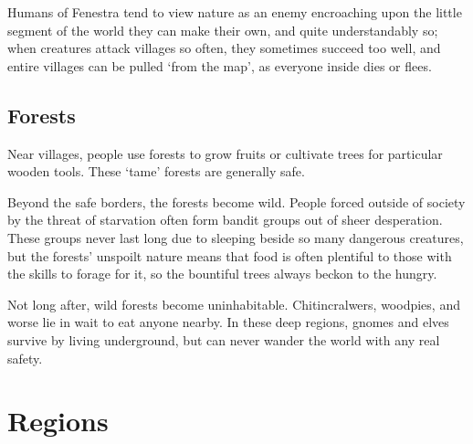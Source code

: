 \begin{multicols}{2}
Humans of Fenestra tend to view nature as an enemy encroaching upon the little segment of the world they can make their own, and quite understandably so; when creatures attack villages so often, they sometimes succeed too well, and entire villages can be pulled `from the map', as everyone inside dies or flees.

\subsection{Forests}

Near villages, people use forests to grow fruits or cultivate trees for particular wooden tools.  These `tame' forests are generally safe.

Beyond the safe borders, the forests become wild.  People forced outside of society by the threat of starvation often form bandit groups out of sheer desperation.  These groups never last long due to sleeping beside so many dangerous creatures, but the forests' unspoilt nature means that food is often plentiful to those with the skills to forage for it, so the bountiful trees always beckon to the hungry.

Not long after, wild forests become uninhabitable.  Chitincralwers, woodpies, and worse lie in wait to eat anyone nearby.  In these deep regions, gnomes and elves survive by living underground, but can never wander the world with any real safety.

\end{multicols}

\section{Regions}\label{encounters}


